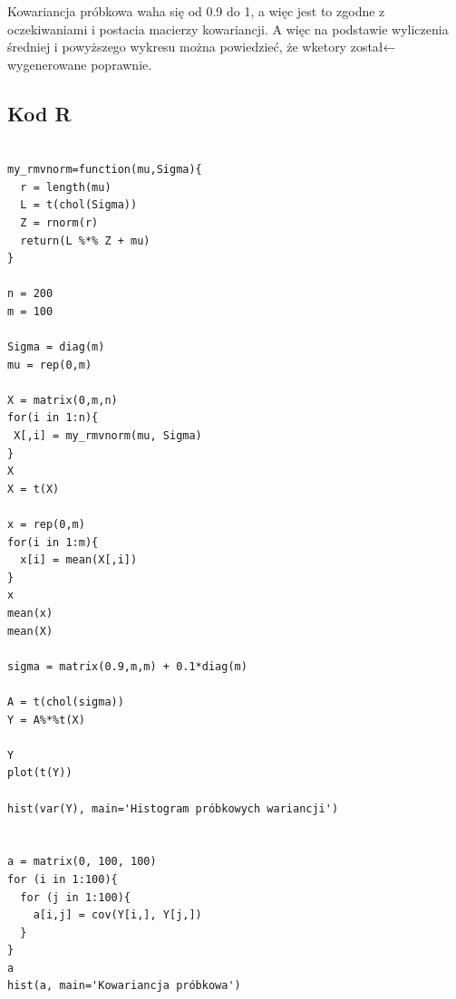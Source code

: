 \documentclass[9pt]{article}  %
\begin{document}
    
    Kowariancja próbkowa waha się od 0.9 do 1, a więc jest to zgodne z oczekiwaniami i postacia macierzy kowariancji. A więc na podstawie wyliczenia średniej i powyższego wykresu można powiedzieć, że wketory został← wygenerowane poprawnie.
    
    
    
    
        \subsection{Kod R}
    
    \begin{lstlisting}

my_rmvnorm=function(mu,Sigma){
  r = length(mu)
  L = t(chol(Sigma)) 
  Z = rnorm(r)
  return(L %*% Z + mu)
}

n = 200
m = 100

Sigma = diag(m)
mu = rep(0,m)

X = matrix(0,m,n)
for(i in 1:n){
 X[,i] = my_rmvnorm(mu, Sigma)
}
X
X = t(X)

x = rep(0,m)
for(i in 1:m){
  x[i] = mean(X[,i])
}
x
mean(x)
mean(X)

sigma = matrix(0.9,m,m) + 0.1*diag(m)

A = t(chol(sigma))
Y = A%*%t(X)

Y
plot(t(Y))

hist(var(Y), main='Histogram próbkowych wariancji')


a = matrix(0, 100, 100)
for (i in 1:100){
  for (j in 1:100){
    a[i,j] = cov(Y[i,], Y[j,])
  }
}
a
hist(a, main='Kowariancja próbkowa')
    \end{lstlisting}   
  
\end{document}
